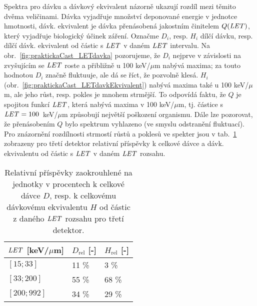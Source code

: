 Spektra pro dávku a dávkový ekvivalent názorně ukazují rozdíl mezi těmito dvěma veličinami. Dávka vyjadřuje množství deponované energie v jednotce hmotnosti, dávk. ekvivalent je dávka přenásobená jakostním činitelem $Q(\mathit{LET})$, který vyjadřuje biologický účinek záření. Označme $D_i$, resp. $H_i$ dílčí dávku, resp. dílčí dávk. ekvivalent od částic s $\mathit{LET}$ v daném $\mathit{LET}$ intervalu. Na obr.~\ref{fig:praktickaCast_LETdavka} pozorujeme, že $D_i$ nejprve v závislosti na zvyšujícím se $\mathit{LET}$ roste a přibližně u 100 keV/$\mu$m nabývá maxima; za touto hodnotou $D_i$ značně fluktuuje, ale dá se říct, že pozvolně klesá. $H_i$ (obr.~\ref{fig:praktickaCast_LETdavkEkvivalent}) nabývá maxima také u 100 keV/$\mu$m, ale jeho růst, resp. pokles je mnohem strmější. To odpovídá faktu, že $Q$ je spojitou funkcí $\mathit{LET}$,
která nabývá maxima v 100 keV/$\mu$m, tj. částice s $\mathit{LET}=\nobreak100$~keV/$\mu$m způsobují největší poškození organismu. Dále lze pozorovat, že přenásobením $Q$ bylo spektrum vyhlazeno (ve smyslu odstranění fluktuací). Pro znázornění rozdílnosti strmostí růstů a poklesů ve spekter jsou v tab.~\ref{tab:praktickaCast_relPrispevkyDavka} zobrazeny pro třetí detektor relativní příspěvky k celkové dávce a dávk. ekvivalentu od částic s $\mathit{LET}$ v daném $\mathit{LET}$ rozsahu.
\begin{table}[ht]
  \centering
  \caption{Relativní příspěvky zaokrouhlené na jednotky v procentech k celkové dávce $D$, resp. k celkovému dávkovému ekvivalentu $H$ od částic z daného $\mathit{LET}$ rozsahu pro třetí detektor.}
  \label{tab:praktickaCast_relPrispevkyDavka}
  \begin{tabular}{lll}
	\toprule
	$\mathit{LET}$ [keV/$\mu$m]& $D_{\text{rel}}$ [-]&$H_{\text{rel}}$ [-]\\
	\midrule
	$[15;33]$&11 \%&3 \%\\
	$[33;200]$&55 \%&68 \%\\
	$[200;992]$&34 \%&29 \%\\
	\bottomrule
  \end{tabular}
\end{table}

